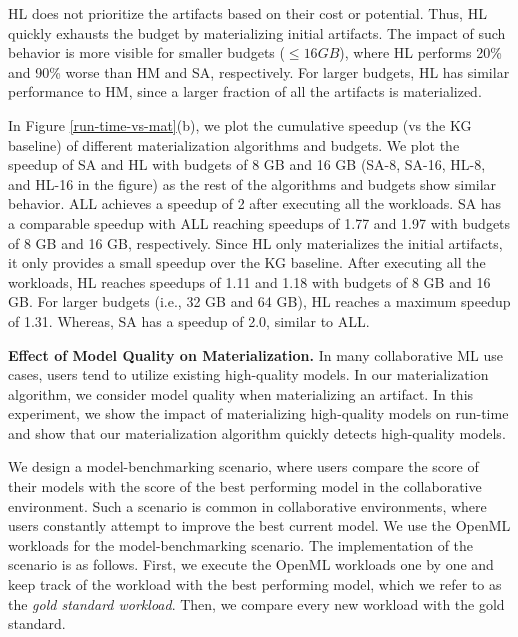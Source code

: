 HL does not prioritize the artifacts based on their cost or potential.
Thus, HL quickly exhausts the budget by materializing initial artifacts.
The impact of such behavior is more visible for smaller budgets ($\leq 16 GB$), where HL performs 20\% and 90\% worse than HM and SA, respectively.
For larger budgets, HL has similar performance to HM, since a larger fraction of all the artifacts is materialized.

In Figure \ref{run-time-vs-mat}(b), we plot the cumulative speedup (vs the KG baseline) of different materialization algorithms and budgets.
We plot the speedup of SA and HL with budgets of 8 GB and 16 GB (SA-8, SA-16, HL-8, and HL-16 in the figure) as the rest of the algorithms and budgets show similar behavior.
ALL achieves a speedup of 2 after executing all the workloads.
SA has a comparable speedup with ALL reaching speedups of 1.77 and 1.97 with budgets of 8 GB and 16 GB, respectively.
Since HL only materializes the initial artifacts, it only provides a small speedup over the KG baseline.
After executing all the workloads, HL reaches speedups of 1.11 and 1.18 with budgets of 8 GB and 16 GB.
For larger budgets (i.e., 32 GB and 64 GB), HL reaches a maximum speedup of 1.31.
Whereas, SA has a speedup of 2.0, similar to ALL.

\textbf{Effect of Model Quality on Materialization.}
In many collaborative ML use cases, users tend to utilize existing high-quality models.
In our materialization algorithm, we consider model quality when materializing an artifact.
In this experiment, we show the impact of materializing high-quality models on run-time and show that our materialization algorithm quickly detects high-quality models.

We design a model-benchmarking scenario, where users compare the score of their models with the score of the best performing model in the collaborative environment.
Such a scenario is common in collaborative environments, where users constantly attempt to improve the best current model.
We use the OpenML workloads for the model-benchmarking scenario.
The implementation of the scenario is as follows.
First, we execute the OpenML workloads one by one and keep track of the workload with the best performing model, which we refer to as the \textit{gold standard workload}.
Then, we compare every new workload with the gold standard.

